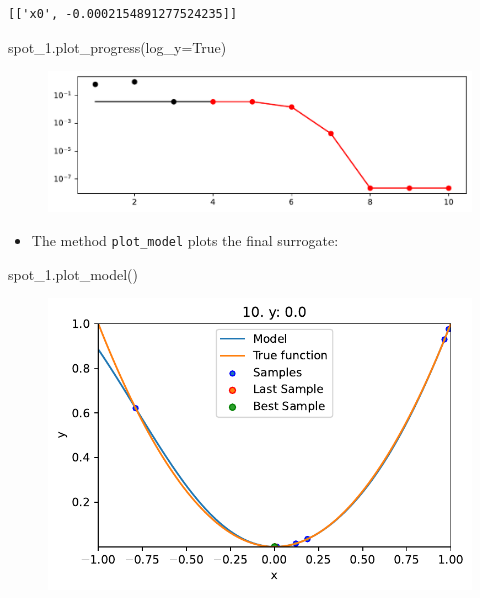 \documentclass[
  letterpaper,
  DIV=11,
  numbers=noendperiod]{scrreprt}
\newenvironment{Shaded}{\begin{snugshade}}{\end{snugshade}}
\newcommand{\NormalTok}[1]{\textcolor[rgb]{0.00,0.23,0.31}{#1}}
\newcommand{\OperatorTok}[1]{\textcolor[rgb]{0.37,0.37,0.37}{#1}}
\newcommand{\VariableTok}[1]{\textcolor[rgb]{0.07,0.07,0.07}{#1}}
\providecommand{\tightlist}{%
  \setlength{\itemsep}{0pt}\setlength{\parskip}{0pt}}\usepackage{longtable,booktabs,array}
\begin{document}
\begin{verbatim}
[['x0', -0.0002154891277524235]]
\end{verbatim}

\begin{Shaded}
\begin{Highlighting}[]
\NormalTok{spot\_1.plot\_progress(log\_y}\OperatorTok{=}\VariableTok{True}\NormalTok{)}
\end{Highlighting}
\end{Shaded}

\begin{figure}[H]

{\centering \includegraphics{010_num_spot_sklearn_surrogate_files/figure-pdf/cell-23-output-1.pdf}

}

\end{figure}

\begin{itemize}
\tightlist
\item
  The method \texttt{plot\_model} plots the final surrogate:
\end{itemize}

\begin{Shaded}
\begin{Highlighting}[]
\NormalTok{spot\_1.plot\_model()}
\end{Highlighting}
\end{Shaded}

\begin{figure}[H]

{\centering \includegraphics{010_num_spot_sklearn_surrogate_files/figure-pdf/cell-24-output-1.pdf}

}

\end{figure}
\end{document}
